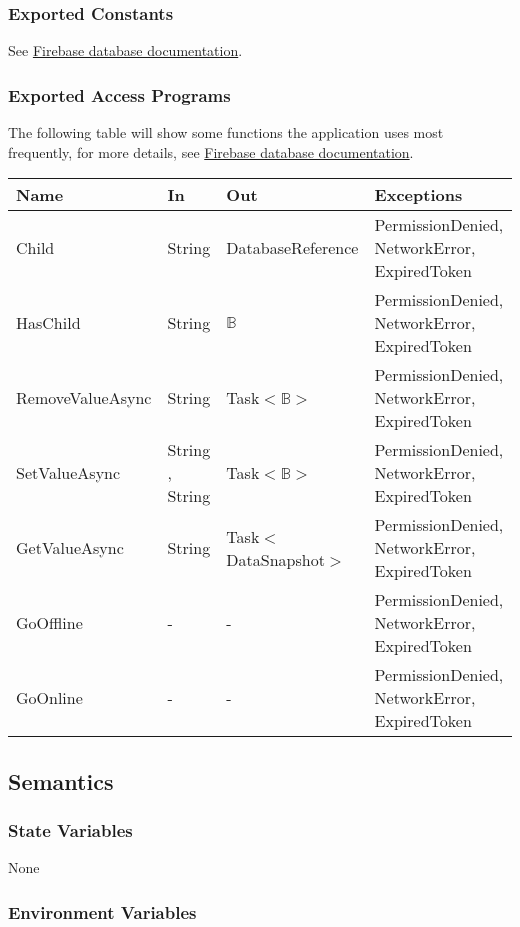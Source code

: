 \documentclass[12pt, titlepage]{article}
\begin{document}
\subsubsection{Exported Constants}
See \href{https://firebase.google.com/docs/reference/unity/namespace/firebase/database}{Firebase database documentation}.
\subsubsection{Exported Access Programs}
The following table will show some functions the application uses most frequently, for more details, see \href{https://firebase.google.com/docs/reference/unity/namespace/firebase/database}{Firebase database documentation}.
\begin{center}
\begin{tabular}{p{4cm} p{2cm} p{4cm} p{4cm}}
\hline
\textbf{Name} & \textbf{In} & \textbf{Out} & \textbf{Exceptions} \\
\hline
Child & String & DatabaseReference & PermissionDenied, NetworkError, ExpiredToken \\
HasChild & String & $\mathbb{B}$ & PermissionDenied, NetworkError, ExpiredToken \\
RemoveValueAsync & String & Task$<\mathbb{B}>$ & PermissionDenied,  NetworkError,  ExpiredToken \\
SetValueAsync & String , String & Task$<\mathbb{B}>$ & PermissionDenied,  NetworkError,  ExpiredToken \\
GetValueAsync & String & Task$<$DataSnapshot$>$ & PermissionDenied, NetworkError,  ExpiredToken \\
GoOffline & - & - & PermissionDenied, NetworkError,  ExpiredToken \\
GoOnline & - & - & PermissionDenied, NetworkError,  ExpiredToken \\
\hline
\end{tabular}
\end{center}

\subsection{Semantics}

\subsubsection{State Variables}

None

\subsubsection{Environment Variables}
\end{document}
